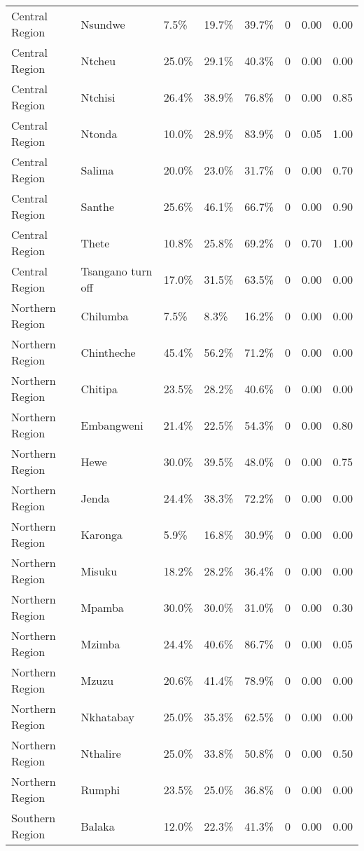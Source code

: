 \begin{table}[ht]
\begin{tabular}{lllllrrr}
  Central Region & Nsundwe & 7.5\% & 19.7\% & 39.7\% & 0 & 0.00 & 0.00 \\ 
  Central Region & Ntcheu & 25.0\% & 29.1\% & 40.3\% & 0 & 0.00 & 0.00 \\ 
  Central Region & Ntchisi & 26.4\% & 38.9\% & 76.8\% & 0 & 0.00 & 0.85 \\ 
  Central Region & Ntonda & 10.0\% & 28.9\% & 83.9\% & 0 & 0.05 & 1.00 \\ 
  Central Region & Salima & 20.0\% & 23.0\% & 31.7\% & 0 & 0.00 & 0.70 \\ 
  Central Region & Santhe & 25.6\% & 46.1\% & 66.7\% & 0 & 0.00 & 0.90 \\ 
  Central Region & Thete & 10.8\% & 25.8\% & 69.2\% & 0 & 0.70 & 1.00 \\ 
  Central Region & Tsangano turn off & 17.0\% & 31.5\% & 63.5\% & 0 & 0.00 & 0.00 \\ 
  Northern Region & Chilumba & 7.5\% & 8.3\% & 16.2\% & 0 & 0.00 & 0.00 \\ 
  Northern Region & Chintheche & 45.4\% & 56.2\% & 71.2\% & 0 & 0.00 & 0.00 \\ 
  Northern Region & Chitipa & 23.5\% & 28.2\% & 40.6\% & 0 & 0.00 & 0.00 \\ 
  Northern Region & Embangweni & 21.4\% & 22.5\% & 54.3\% & 0 & 0.00 & 0.80 \\ 
  Northern Region & Hewe & 30.0\% & 39.5\% & 48.0\% & 0 & 0.00 & 0.75 \\ 
  Northern Region & Jenda & 24.4\% & 38.3\% & 72.2\% & 0 & 0.00 & 0.00 \\ 
  Northern Region & Karonga & 5.9\% & 16.8\% & 30.9\% & 0 & 0.00 & 0.00 \\ 
  Northern Region & Misuku & 18.2\% & 28.2\% & 36.4\% & 0 & 0.00 & 0.00 \\ 
  Northern Region & Mpamba & 30.0\% & 30.0\% & 31.0\% & 0 & 0.00 & 0.30 \\ 
  Northern Region & Mzimba & 24.4\% & 40.6\% & 86.7\% & 0 & 0.00 & 0.05 \\ 
  Northern Region & Mzuzu & 20.6\% & 41.4\% & 78.9\% & 0 & 0.00 & 0.00 \\ 
  Northern Region & Nkhatabay & 25.0\% & 35.3\% & 62.5\% & 0 & 0.00 & 0.00 \\ 
  Northern Region & Nthalire & 25.0\% & 33.8\% & 50.8\% & 0 & 0.00 & 0.50 \\ 
  Northern Region & Rumphi & 23.5\% & 25.0\% & 36.8\% & 0 & 0.00 & 0.00 \\ 
  Southern Region & Balaka & 12.0\% & 22.3\% & 41.3\% & 0 & 0.00 & 0.00 \\ 

\end{tabular}
\end{table}
